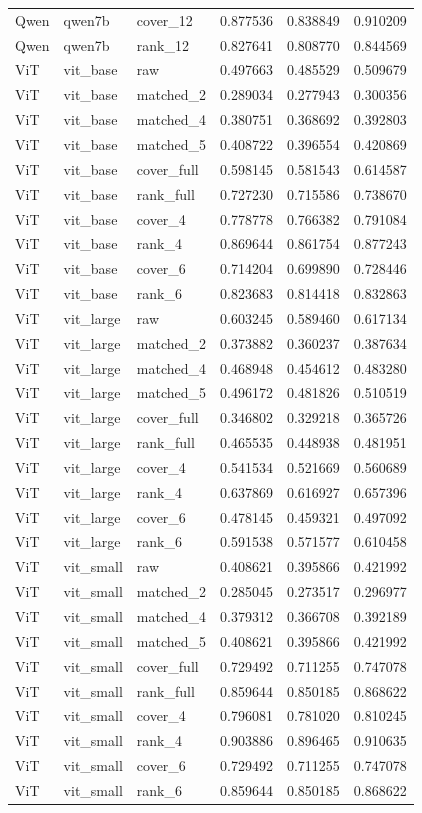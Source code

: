 \begin{tabular}{lllrrr}
Qwen & qwen7b & cover_12 & 0.877536 & 0.838849 & 0.910209 \\
Qwen & qwen7b & rank_12 & 0.827641 & 0.808770 & 0.844569 \\
ViT & vit_base & raw & 0.497663 & 0.485529 & 0.509679 \\
ViT & vit_base & matched_2 & 0.289034 & 0.277943 & 0.300356 \\
ViT & vit_base & matched_4 & 0.380751 & 0.368692 & 0.392803 \\
ViT & vit_base & matched_5 & 0.408722 & 0.396554 & 0.420869 \\
ViT & vit_base & cover_full & 0.598145 & 0.581543 & 0.614587 \\
ViT & vit_base & rank_full & 0.727230 & 0.715586 & 0.738670 \\
ViT & vit_base & cover_4 & 0.778778 & 0.766382 & 0.791084 \\
ViT & vit_base & rank_4 & 0.869644 & 0.861754 & 0.877243 \\
ViT & vit_base & cover_6 & 0.714204 & 0.699890 & 0.728446 \\
ViT & vit_base & rank_6 & 0.823683 & 0.814418 & 0.832863 \\
ViT & vit_large & raw & 0.603245 & 0.589460 & 0.617134 \\
ViT & vit_large & matched_2 & 0.373882 & 0.360237 & 0.387634 \\
ViT & vit_large & matched_4 & 0.468948 & 0.454612 & 0.483280 \\
ViT & vit_large & matched_5 & 0.496172 & 0.481826 & 0.510519 \\
ViT & vit_large & cover_full & 0.346802 & 0.329218 & 0.365726 \\
ViT & vit_large & rank_full & 0.465535 & 0.448938 & 0.481951 \\
ViT & vit_large & cover_4 & 0.541534 & 0.521669 & 0.560689 \\
ViT & vit_large & rank_4 & 0.637869 & 0.616927 & 0.657396 \\
ViT & vit_large & cover_6 & 0.478145 & 0.459321 & 0.497092 \\
ViT & vit_large & rank_6 & 0.591538 & 0.571577 & 0.610458 \\
ViT & vit_small & raw & 0.408621 & 0.395866 & 0.421992 \\
ViT & vit_small & matched_2 & 0.285045 & 0.273517 & 0.296977 \\
ViT & vit_small & matched_4 & 0.379312 & 0.366708 & 0.392189 \\
ViT & vit_small & matched_5 & 0.408621 & 0.395866 & 0.421992 \\
ViT & vit_small & cover_full & 0.729492 & 0.711255 & 0.747078 \\
ViT & vit_small & rank_full & 0.859644 & 0.850185 & 0.868622 \\
ViT & vit_small & cover_4 & 0.796081 & 0.781020 & 0.810245 \\
ViT & vit_small & rank_4 & 0.903886 & 0.896465 & 0.910635 \\
ViT & vit_small & cover_6 & 0.729492 & 0.711255 & 0.747078 \\
ViT & vit_small & rank_6 & 0.859644 & 0.850185 & 0.868622 \\
\bottomrule
\end{tabular}
